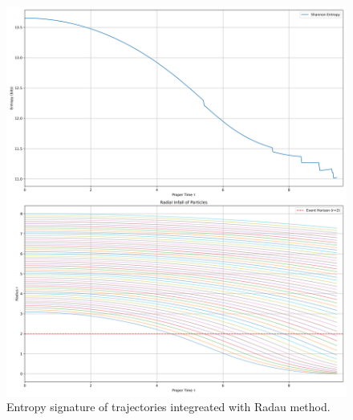 \documentclass[11pt]{article}
\begin{document}
\begin{figure}[h!]
  \centering
  \includegraphics[width=\textwidth]{figures/schwarzschild_radau.png}
  \caption{Entropy signature of trajectories integreated with Radau method.}
  \label{fig:schwarzschild_radau}
\end{figure}
\end{document}
